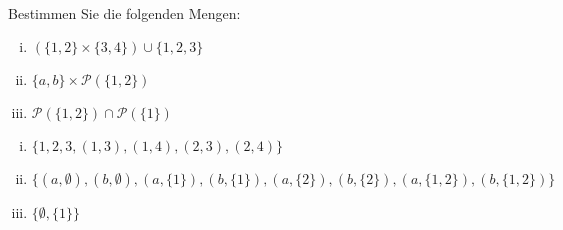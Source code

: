 \newcommand{\printpraesenzlsg}{false}
\newcommand{\printloesungen}{true}
\newcommand{\printbewertungen}{false}
\newcommand{\blattnummer}{3}



\iforiginal{}

	

\\
Bestimmen Sie die folgenden Mengen:
\begin{enumerate}[(i)]
  \item $(\{1,2\}\times\{3,4\})\cup\{1,2,3\}$
  \item $\{a,b\}\times\mathscr{P}(\{1,2\})$
  \item $\mathscr{P}(\{1,2\})\cap\mathscr{P}(\{1\})$
\end{enumerate}

\begin{loesung}
\begin{enumerate}[(i)]
  \item $\{1,2,3,(1,3),(1,4),(2,3),(2,4)\}$
  \item $\{(a,\emptyset),(b,\emptyset),(a,\{1\}),(b,\{1\}),(a,\{2\}),(b,\{2\}),(a,\{1,2\}),(b,\{1,2\})\}$
  \item $\{\emptyset, \{1\}\}$
  
\end{enumerate}
\end{loesung}

